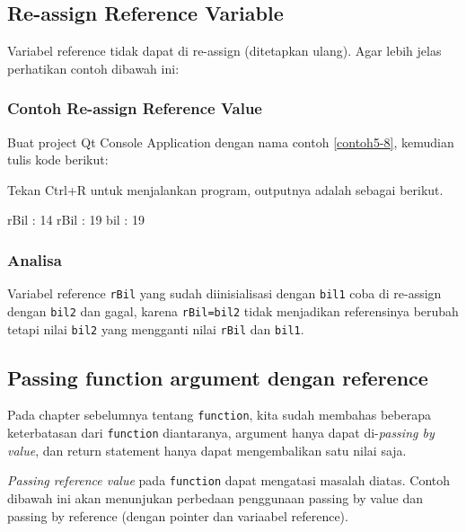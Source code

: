 \subsection{Re-assign Reference Variable}\label{re-assign-reference-variable}

Variabel reference tidak dapat di re-assign (ditetapkan ulang). Agar
lebih jelas perhatikan contoh dibawah ini:

\subsubsection*{Contoh Re-assign Reference Value}

Buat project Qt Console Application dengan nama contoh \ref{contoh5-8}, kemudian tulis
kode berikut:



Tekan Ctrl+R untuk menjalankan program, outputnya adalah sebagai
berikut.

\begin{lcverbatim}
rBil : 14
rBil : 19
bil : 19
\end{lcverbatim}

\subsubsection*{Analisa}

Variabel reference \texttt{rBil} yang sudah diinisialisasi dengan
\texttt{bil1} coba di re-assign dengan \texttt{bil2} dan gagal, karena
\texttt{rBil=bil2} tidak menjadikan referensinya berubah tetapi nilai
\texttt{bil2} yang mengganti nilai \texttt{rBil} dan \texttt{bil1}.

\subsection{Passing function argument dengan reference}\label{passing-function-argument-dengan-reference}

Pada chapter sebelumnya tentang \texttt{function}, kita sudah membahas
beberapa keterbatasan dari \texttt{function} diantaranya, argument hanya
dapat di-\emph{passing by value}, dan return statement hanya dapat
mengembalikan satu nilai saja.

\emph{Passing reference value} pada \texttt{function} dapat mengatasi
masalah diatas. Contoh dibawah ini akan menunjukan perbedaan penggunaan
passing by value dan passing by reference (dengan pointer dan variaabel
reference).

